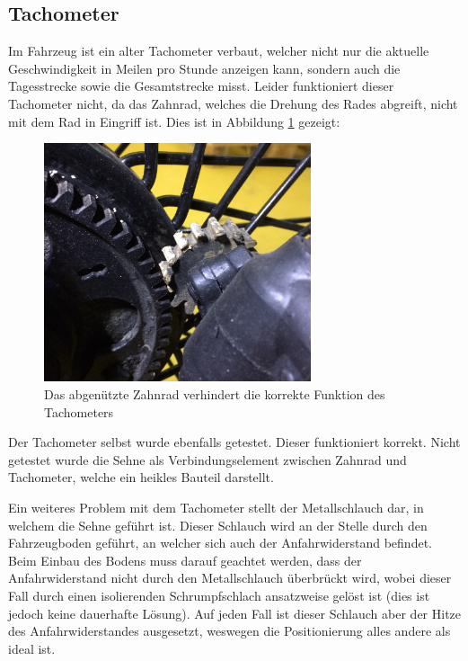 \subsection{Tachometer}
Im Fahrzeug ist ein alter Tachometer verbaut, welcher nicht nur die aktuelle Geschwindigkeit in Meilen pro Stunde anzeigen kann, sondern auch die Tagesstrecke sowie die Gesamtstrecke misst. Leider funktioniert dieser Tachometer nicht, da das Zahnrad, welches die Drehung des Rades abgreift, nicht mit dem Rad in Eingriff ist. Dies ist in Abbildung \ref{fig:Zahnrad} gezeigt:

\begin{figure}[h]
	\centering
		\includegraphics[width=0.70\textwidth]{images/Zahnrad.jpg}
	\caption{Das abgenützte Zahnrad verhindert die korrekte Funktion des Tachometers}
	\label{fig:Zahnrad}
\end{figure}

Der Tachometer selbst wurde ebenfalls getestet. Dieser funktioniert korrekt. Nicht getestet wurde die Sehne als Verbindungselement zwischen Zahnrad und Tachometer, welche ein heikles Bauteil darstellt.

Ein weiteres Problem mit dem Tachometer stellt der Metallschlauch dar, in welchem die Sehne geführt ist. Dieser Schlauch wird an der Stelle durch den Fahrzeugboden geführt, an welcher sich auch der Anfahrwiderstand befindet. Beim Einbau des Bodens muss darauf geachtet werden, dass der Anfahrwiderstand nicht durch den Metallschlauch überbrückt wird, wobei dieser Fall durch einen isolierenden Schrumpfschlach ansatzweise gelöst ist (dies ist jedoch keine dauerhafte Lösung). Auf jeden Fall ist dieser Schlauch aber der Hitze des Anfahrwiderstandes ausgesetzt, weswegen die Positionierung alles andere als ideal ist.

